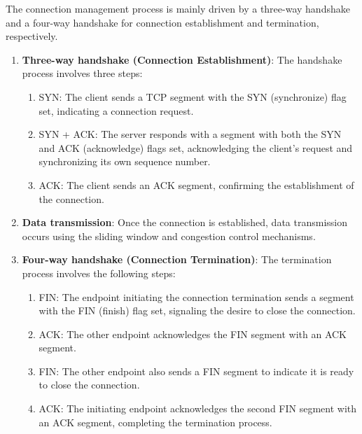 The connection management process is mainly driven by a three-way handshake and a four-way handshake for connection establishment and termination, respectively.

\vspace{-0.5em}
\begin{enumerate}
    \item \textbf{Three-way handshake (Connection Establishment)}: The handshake process involves three steps:
        \begin{enumerate} \small
            \item SYN: The client sends a TCP segment with the SYN (synchronize) flag set, indicating a connection request.
            \item SYN + ACK: The server responds with a segment with both the SYN and ACK (acknowledge) flags set, acknowledging the client's request and synchronizing its own sequence number.
            \item ACK: The client sends an ACK segment, confirming the establishment of the connection.
        \end{enumerate}
    \item \textbf{Data transmission}: Once the connection is established, data transmission occurs using the sliding window and congestion control mechanisms.
    \item \textbf{Four-way handshake (Connection Termination)}: The termination process involves the following steps:
        \begin{enumerate} \small
            \item FIN: The endpoint initiating the connection termination sends a segment with the FIN (finish) flag set, signaling the desire to close the connection.
            \item ACK: The other endpoint acknowledges the FIN segment with an ACK segment.
            \item FIN: The other endpoint also sends a FIN segment to indicate it is ready to close the connection.
            \item ACK: The initiating endpoint acknowledges the second FIN segment with an ACK segment, completing the termination process.
        \end{enumerate}
\end{enumerate}

\renewcommand*{\thefootnote}{\fnsymbol{footnote}}
\renewcommand*{\thefootnote}{\arabic{footnote}}
